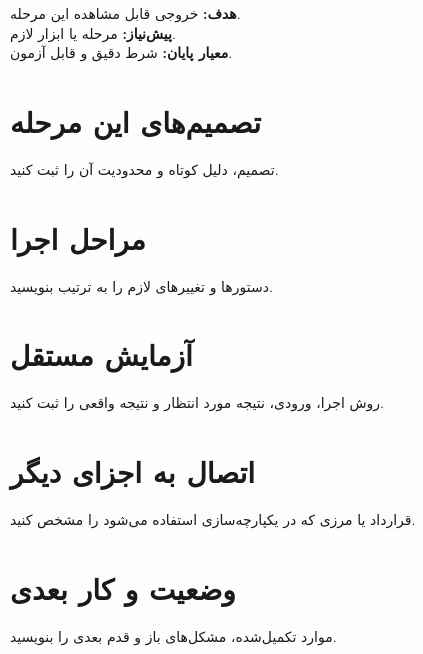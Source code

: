 \begin{phasebox}
\textbf{هدف:} خروجی قابل مشاهده این مرحله.\\
\textbf{پیش‌نیاز:} مرحله یا ابزار لازم.\\
\textbf{معیار پایان:} شرط دقیق و قابل آزمون.
\end{phasebox}

\section{تصمیم‌های این مرحله}
تصمیم، دلیل کوتاه و محدودیت آن را ثبت کنید.

\section{مراحل اجرا}
دستورها و تغییرهای لازم را به ترتیب بنویسید.

\section{آزمایش مستقل}
روش اجرا، ورودی، نتیجه مورد انتظار و نتیجه واقعی را ثبت کنید.

\section{اتصال به اجزای دیگر}
قرارداد یا مرزی که در یکپارچه‌سازی استفاده می‌شود را مشخص کنید.

\section{وضعیت و کار بعدی}
موارد تکمیل‌شده، مشکل‌های باز و قدم بعدی را بنویسید.
